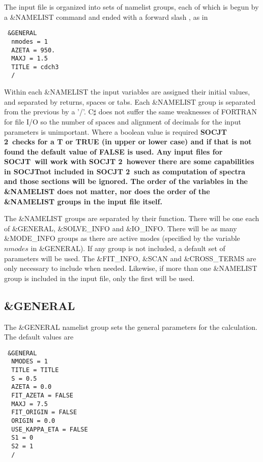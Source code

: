 \documentclass{article}
\newcommand{\socjttwo}{\bf{SOCJT 2}}
\newcommand{\socjt}{{\bf SOCJT}}
\begin{document}
The input file is organized into sets of namelist groups, each of
which is begun by a \&NAMELIST command and ended with a forward slash
\/, as in 
\begin{verbatim}
 &GENERAL 
  nmodes = 1
  AZETA = 950.
  MAXJ = 1.5
  TITLE = cdch3 
  /
\end{verbatim}
Within each \&NAMELIST the input variables are assigned their initial
values, and separated by returns, spaces or tabs. Each \&NAMELIST group is separated from
the previous by a '/'. C$\sharp$ does not suffer the same weaknesses of FORTRAN for file I/O
so the number of spaces and alignment of decimals for the input parameters is unimportant.
Where a boolean value is required \socjttwo\ checks for a T or TRUE (in upper or lower case)
and if that is not found the default value of FALSE is used. Any input files for \socjt\ will work
with \socjttwo\ however there are some capabilities in \socjt not included in \socjttwo\ such as 
computation of spectra and those sections will be ignored. The order of the variables in
the \&NAMELIST does not matter, nor does the order of the \&NAMELIST
groups in the input file itself.

The \&NAMELIST groups are separated by their function. There will be one each of
\&GENERAL, \&SOLVE\_INFO and \&IO\_INFO. There will be as many \&MODE\_INFO groups as there are active modes
(specified by the variable $nmodes$ in \&GENERAL). If any group is not included,
a default set of parameters will be used. The \&FIT\_INFO, \&SCAN and \&CROSS\_TERMS 
are only necessary to include when needed. Likewise, if more than one
\&NAMELIST group is included in the input file, only the first will be
used. 


\subsection{\&GENERAL}

The \&GENERAL namelist group sets the general parameters for the
calculation. The default values are

\begin{verbatim}
 &GENERAL 
  NMODES = 1
  TITLE = TITLE
  S = 0.5
  AZETA = 0.0
  FIT_AZETA = FALSE
  MAXJ = 7.5
  FIT_ORIGIN = FALSE
  ORIGIN = 0.0
  USE_KAPPA_ETA = FALSE
  S1 = 0
  S2 = 1
  /
\end{verbatim}
\end{document}
